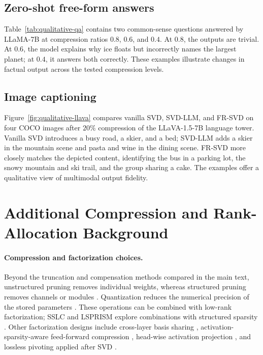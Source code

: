\subsection{Zero-shot free-form answers}
Table~\ref{tab:qualitative-qa} contains two common-sense questions answered by LLaMA-7B at compression ratios $0.8$, $0.6$, and $0.4$. At $0.8$, the outputs are trivial. At $0.6$, the model explains why ice floats but incorrectly names the largest planet; at $0.4$, it answers both correctly. These examples illustrate changes in factual output across the tested compression levels.



\subsection{Image captioning}
Figure~\ref{fig:qualitative-llava} compares vanilla SVD, SVD-LLM, and FR-SVD on four COCO images after $20\%$ compression of the LLaVA-1.5-7B language tower. Vanilla SVD introduces a busy road, a skier, and a bed; SVD-LLM adds a skier in the mountain scene and pasta and wine in the dining scene. FR-SVD more closely matches the depicted content, identifying the bus in a parking lot, the snowy mountain and ski trail, and the group sharing a cake. The examples offer a qualitative view of multimodal output fidelity.



\section{Additional Compression and Rank-Allocation Background}\label{app:related-work}

\paragraph{Compression and factorization choices.}
Beyond the truncation and compensation methods compared in the main text, unstructured pruning removes individual weights, whereas structured pruning removes channels or modules \citep{frantar2023sparsegpt,ma2023llmpruner,ashkboos2024slicegpt}. Quantization reduces the numerical precision of the stored parameters \citep{frantar2023gptq,lin2023awq}. These operations can be combined with low-rank factorization; SSLC and LSPRISM explore combinations with structured sparsity \citep{zong2025sslc,tao2025lsprism}. Other factorization designs include cross-layer basis sharing \citep{wang2024basissharing}, activation-sparsity-aware feed-forward compression \citep{huang2025sola}, head-wise activation projection \citep{tian2025flatllm}, and lossless pivoting applied after SVD \citep{zhao2025pifa}.

